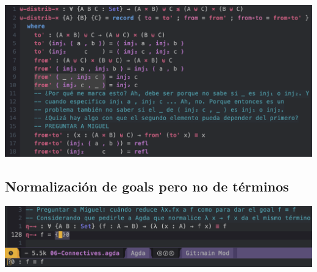 \documentclass{article}
\begin{document}
\includegraphics[width=\textwidth]{consulta2.png}

\subsection{Normalización de goals pero no de términos}

\includegraphics[width=\textwidth]{consulta1.png}
\end{document}
